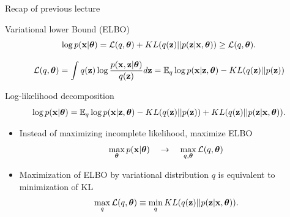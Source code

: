 \begin{frame}{Recap of previous lecture}
	\begin{block}{Variational lower Bound (ELBO)}
		\vspace{-0.3cm}
		\[
			\log p(\mathbf{x}| \boldsymbol{\theta}) = \mathcal{L} (q, \boldsymbol{\theta}) + KL(q(\mathbf{z}) || p(\mathbf{z}|\mathbf{x}, \boldsymbol{\theta})) \geq \mathcal{L} (q, \boldsymbol{\theta}).
		\]
	\end{block}
	
	\vspace{-0.5cm}
	\[
	 \mathcal{L} (q, \boldsymbol{\theta}) = \int q(\mathbf{z}) \log \frac{p(\mathbf{x}, \mathbf{z} | \boldsymbol{\theta})}{q(\mathbf{z})}d\mathbf{z} = \mathbb{E}_{q} \log p(\mathbf{x} | \mathbf{z}, \boldsymbol{\theta}) - KL (q(\mathbf{z}) || p(\mathbf{z}))
	\]
	\vspace{-0.3cm}
	\begin{block}{Log-likelihood decomposition}
		\vspace{-0.5cm}
		\[
		 \log p(\mathbf{x}| \boldsymbol{\theta}) = \mathbb{E}_{q} \log p(\mathbf{x} | \mathbf{z}, \boldsymbol{\theta}) - KL (q(\mathbf{z}) || p(\mathbf{z})) + KL(q(\mathbf{z}) || p(\mathbf{z}|\mathbf{x}, \boldsymbol{\theta})).
		\]
	\end{block}
	\begin{itemize}
	\item Instead of maximizing incomplete likelihood, maximize ELBO
   	\[
  \max_{\boldsymbol{\theta}} p(\mathbf{x} | \boldsymbol{\theta}) \quad \rightarrow \quad \max_{q, \boldsymbol{\theta}} \mathcal{L} (q, \boldsymbol{\theta})
   	\]
   	\item Maximization of ELBO by variational distribution $q$ is equivalent to minimization of KL
  	\[
  \max_q \mathcal{L} (q, \boldsymbol{\theta}) \equiv \min_q KL(q(\mathbf{z}) || p(\mathbf{z}|\mathbf{x}, \boldsymbol{\theta})).
  	\]
  	\end{itemize}
		   	    
\end{frame}

